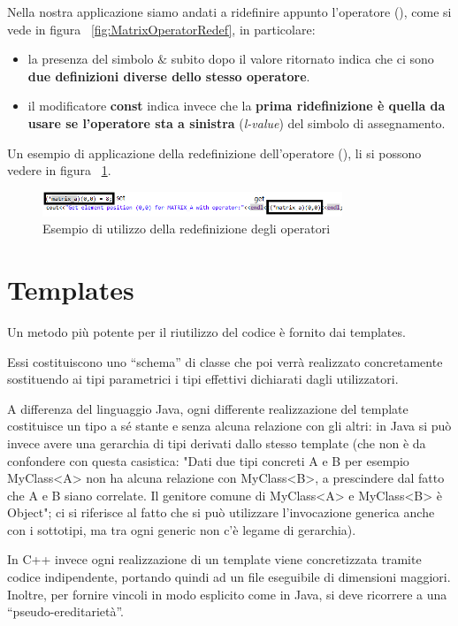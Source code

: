 Nella nostra applicazione siamo andati a ridefinire appunto l'operatore (), come si vede in figura ~\ref{fig:MatrixOperatorRedef}, in particolare:
\begin{itemize}
	\item  la presenza del simbolo \textbf{$\&$} subito dopo il valore ritornato indica che ci sono\textbf{ due definizioni diverse dello stesso operatore}.
	\item il modificatore \textbf{const} indica invece che la\textbf{ prima ridefinizione è quella da usare se l'operatore sta a sinistra} (\textit{l-value}) del simbolo di assegnamento.
\end{itemize}
Un esempio di applicazione della redefinizione dell'operatore (), li si possono vedere in figura ~\ref{fig:OperatorExamples}.

\begin{figure}[h]
	\centering
	\includegraphics[width=0.8\textwidth]{Immagini/OperatorExample.png}
	\caption{Esempio di utilizzo della redefinizione degli operatori}
	\label{fig:OperatorExamples}
\end{figure}

\section{Templates}
Un metodo più potente per il riutilizzo del codice è fornito dai templates. 

Essi costituiscono uno “schema” di classe che poi verrà realizzato concretamente sostituendo ai tipi parametrici i tipi effettivi dichiarati dagli utilizzatori.

A differenza del linguaggio Java, ogni differente realizzazione del template costituisce un tipo
a sé stante e senza alcuna relazione con gli altri: in Java si può invece avere una gerarchia di tipi derivati dallo stesso template (che non è da confondere con questa casistica: "Dati due tipi concreti A e B per esempio MyClass<A> non ha alcuna relazione con MyClass<B>, a prescindere dal fatto che A e B siano correlate.
Il genitore comune di MyClass<A> e MyClass<B> è Object"; ci si riferisce al fatto che si può utilizzare l'invocazione generica anche con i sottotipi, ma tra ogni generic non c'è legame di gerarchia).


In C++ invece ogni realizzazione di un template viene concretizzata tramite codice
indipendente, portando quindi ad un file eseguibile di dimensioni maggiori. Inoltre, per fornire
vincoli in modo esplicito come in Java, si deve ricorrere a una “pseudo-ereditarietà”.


